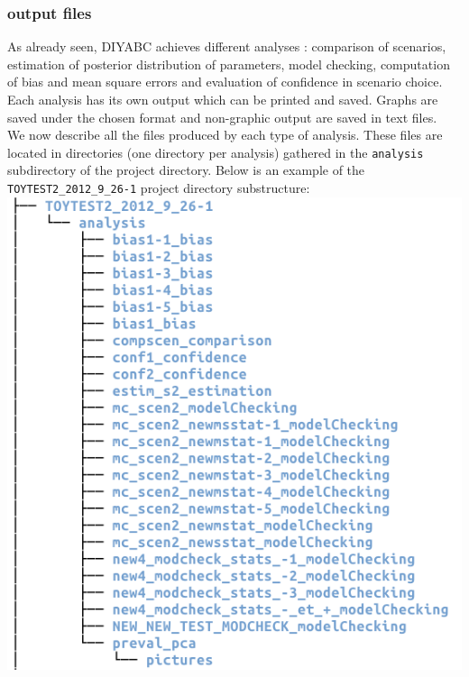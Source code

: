 \subsubsection{output files}
As already seen, DIYABC achieves different analyses : comparison of scenarios, estimation of posterior distribution of parameters, model checking,  computation of bias and mean square errors and evaluation of confidence in scenario choice. Each analysis has its own output which can be printed and saved. Graphs are saved under the chosen format and non-graphic output are saved in text files.\\

We now describe all the files produced by each type of analysis. These files are located in directories (one directory per analysis) gathered in the \texttt{analysis} subdirectory of the project directory. Below is an example of the \texttt{TOYTEST2\_2012\_9\_26-1} project directory substructure:\\

\includegraphics[scale=0.5]{gui_pictures/Capture-DIYABC-103.png}\\

